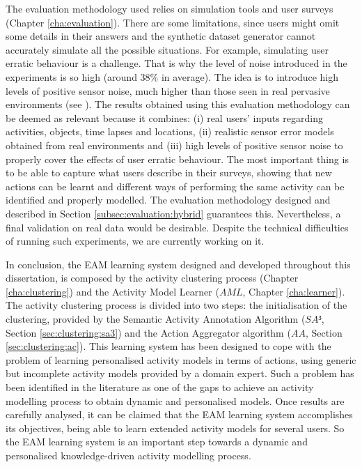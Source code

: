 The evaluation methodology used relies on simulation tools and user surveys (Chapter \ref{cha:evaluation}). There are some limitations, since users might omit some details in their answers and the synthetic dataset generator cannot accurately simulate all the possible situations. For example, simulating user erratic behaviour is a challenge. That is why the level of noise introduced in the experiments is so high (around 38\% in average). The idea is to introduce high levels of positive sensor noise, much higher than those seen in real pervasive environments (see \cite{Chen2012}). The results obtained using this evaluation methodology can be deemed as relevant because it combines: (i) real users' inputs regarding activities, objects, time lapses and locations, (ii) realistic sensor error models obtained from real environments and (iii) high levels of positive sensor noise to properly cover the effects of user erratic behaviour. The most important thing is to be able to capture what users describe in their surveys, showing that new actions can be learnt and different ways of performing the same activity can be identified and properly modelled. The evaluation methodology designed and described in Section \ref{subsec:evaluation:hybrid} guarantees this. Nevertheless, a final validation on real data would be desirable. Despite the technical difficulties of running such experiments, we are currently working on it.

In conclusion, the EAM learning system designed and developed throughout this dissertation, is composed by the activity clustering process (Chapter \ref{cha:clustering}) and the Activity Model Learner ($AML$, Chapter \ref{cha:learner}). The activity clustering process is divided into two steps: the initialisation of the clustering, provided by the Semantic Activity Annotation Algorithm ($SA³$, Section \ref{sec:clustering:sa3}) and the Action Aggregator algorithm ($AA$, Section \ref{sec:clustering:ac}). This learning system has been designed to cope with the problem of learning personalised activity models in terms of actions, using generic but incomplete activity models provided by a domain expert. Such a problem has been identified in the literature as one of the gaps to achieve an activity modelling process to obtain dynamic and personalised models. Once results are carefully analysed, it can be claimed that the EAM learning system accomplishes its objectives, being able to learn extended activity models for several users. So the EAM learning system is an important step towards a dynamic and personalised knowledge-driven activity modelling process. 